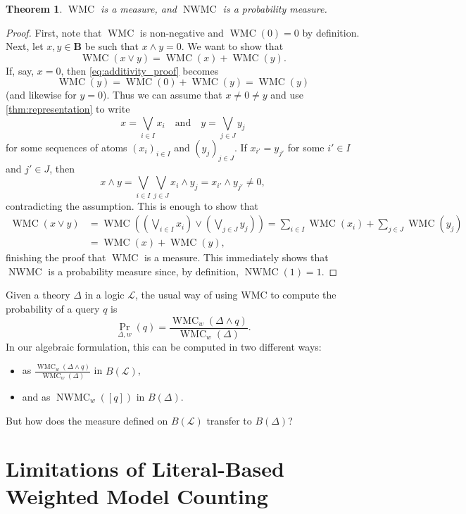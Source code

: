 \documentclass{article}
\newtheorem{theorem}{Theorem}
\theoremstyle{definition}
\theoremstyle{remark}
\DeclareMathOperator{\WMC}{WMC}
\DeclareMathOperator{\nWMC}{NWMC}
\begin{document}
\begin{theorem}
  $\WMC$ is a measure, and $\nWMC$ is a probability measure.
\end{theorem}
\begin{proof}
  First, note that $\WMC$ is non-negative and $\WMC(0) = 0$ by definition. Next,
  let $x, y \in \mathbf{B}$ be such that $x \land y = 0$. We want to show that
  \begin{equation} \label{eq:additivity_proof}
    \WMC(x \lor y) = \WMC(x) + \WMC(y).
  \end{equation}
  If, say, $x = 0$, then \cref{eq:additivity_proof} becomes
  \[
    \WMC(y) = \WMC(0) + \WMC(y) = \WMC(y)
  \]
  (and likewise for $y = 0$). Thus we can assume that $x \ne 0 \ne y$ and use
  \cref{thm:representation} to write
  \[
    x = \bigvee_{i \in I} x_i \quad \text{and} \quad y = \bigvee_{j \in J} y_j
  \]
  for some sequences of atoms $(x_i)_{i \in I}$ and $(y_j)_{j \in J}$. If
  $x_{i'} = y_{j'}$ for some $i' \in I$ and $j' \in J$, then
  \[
    x \land y = \bigvee_{i \in I} \bigvee_{j \in J} x_i \land y_j = x_{i'} \land
    y_{j'} \ne 0,
  \]
  contradicting the assumption. This is enough to show that
  \begin{align*}
    \WMC(x \lor y) &= \WMC\left( \left( \bigvee_{i \in I} x_i \right) \lor \left(\bigvee_{j \in J} y_j \right) \right) = \sum_{i \in I} \WMC(x_i) + \sum_{j \in J} \WMC(y_j) \\
                   &= \WMC(x) + \WMC(y),
  \end{align*}
  finishing the proof that $\WMC$ is a measure. This immediately shows that
  $\nWMC$ is a probability measure since, by definition, $\nWMC(1) = 1$.
\end{proof}

Given a theory $\Delta$ in a logic $\mathcal{L}$, the usual way of using WMC to
compute the probability of a query $q$ is
\cite{DBLP:conf/uai/Belle17,DBLP:conf/aaai/SangBK05}
\[
  \Pr_{\Delta, w}(q) = \frac{\WMC_w(\Delta \land q)}{\WMC_w(\Delta)}.
\]
In our algebraic formulation, this can be computed in two different ways:
\begin{itemize}
\item as $\frac{\WMC_w(\Delta \land q)}{\WMC_w(\Delta)}$ in $B(\mathcal{L})$,
\item and as $\nWMC_w([q])$ in $B(\Delta)$.
\end{itemize}
But how does the measure defined on $B(\mathcal{L})$ transfer to $B(\Delta)$?

\section{Limitations of Literal-Based Weighted Model Counting}
\end{document}
